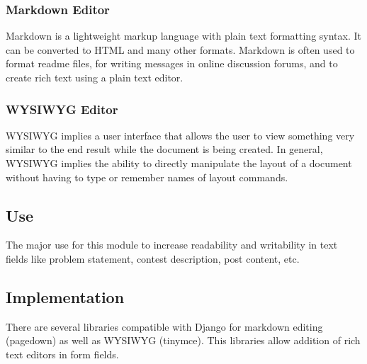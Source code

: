 \subsubsection{Markdown Editor}
Markdown is a lightweight markup language with plain text formatting syntax. It can be converted to HTML and many other formats. Markdown is often used to format readme files, for writing messages in online discussion forums, and to create rich text using a plain text editor.
\subsubsection{WYSIWYG Editor}
WYSIWYG implies a user interface that allows the user to view something very similar to the end result while the document is being created. In general, WYSIWYG implies the ability to directly manipulate the layout of a document without having to type or remember names of layout commands.
\subsection{Use}
The major use for this module to increase readability and writability in text fields like problem statement, contest description, post content, etc.
\subsection{Implementation}
There are several libraries compatible with Django for markdown editing (pagedown) as well as WYSIWYG (tinymce). This libraries allow addition of rich text editors in form fields.

